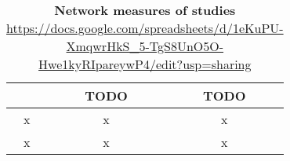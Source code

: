 \begin{table}
\centering
\caption[Network measures of studies]{\textbf{Network measures of studies} \url{https://docs.google.com/spreadsheets/d/1eKuPU-XmqwrHkS_5-TgS8UnO5O-Hwe1kyRIpareywP4/edit?usp=sharing}}
\label{tab:studies-measures}
\vspace*{5mm}
\begin{tabular}{ccc}
	\toprule
	{}  & TODO & TODO \\
	\midrule

	x & x & x\\
	x & x & x\\
	\bottomrule
\end{tabular}
\end{table}
